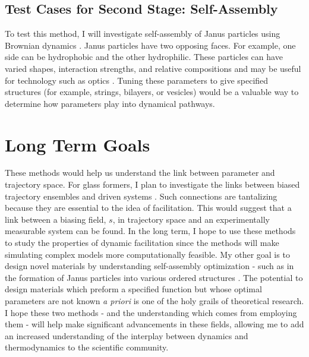 \documentclass[11pt]{article}
\begin{document}
\subsection*{Test Cases for Second Stage: Self-Assembly}
To test this method, I will investigate self-assembly of Janus particles using Brownian dynamics \cite{Jiang2007}.  Janus particles have two opposing faces. For example, one side can be hydrophobic and the other hydrophilic.  These particles can have varied shapes, interaction strengths, and relative compositions and may be useful for technology such as optics \cite{Glotzer2007}.  Tuning these parameters to give specified structures (for example, strings, bilayers, or vesicles) would be a valuable way to determine how parameters play into dynamical pathways. 

\section*{Long Term Goals}
These methods would help us understand the link between parameter and trajectory space.  For glass formers, I plan to investigate the links between biased trajectory ensembles and driven systems \cite{Speck2010}. Such connections are tantalizing because they are essential to the idea of facilitation. This would suggest that a link between a biasing field, $s$, in trajectory space and an experimentally measurable system can be found.  In the long term, I hope to use these methods to study the properties of dynamic facilitation since the methods will make simulating complex models more computationally feasible. My other goal is to  design novel materials by understanding self-assembly optimization - such as in the formation of Janus particles into various ordered structures \cite{Glotzer2007}.   The potential to design materials which preform a specified function but whose optimal parameters are not known {\it a priori} is one of the holy grails of theoretical research.  I hope these two methods - and the understanding which comes from employing them - will help make significant advancements in these fields, allowing me to add an increased understanding of the interplay between dynamics and thermodynamics to the scientific community.
%

%
\end{document}
